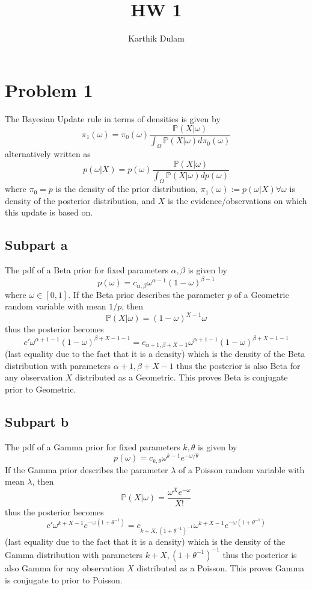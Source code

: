 \documentclass{article}
\title{HW 1}
\author{Karthik Dulam}
\theoremstyle{mytheoremstyle}
\theoremstyle{mytheoremstyle}
\theoremstyle{myproblemstyle}
\begin{document}
    \maketitle
    \section*{Problem 1}
The Bayesian Update rule in terms of densities is given by 
$$ \pi_1(\omega) = \pi_0(\omega) \frac {\mathbb P(X | \omega)} {\int_\Omega \mathbb P(X | \omega) d\pi_0(\omega)}$$
alternatively written as
$$ p(\omega | X) = p(\omega) \frac {\mathbb P(X | \omega)} {\int_\Omega \mathbb P(X | \omega) dp(\omega)}$$
where $\pi_0 = p$ is the density of the prior distribution, $\pi_1(\omega) := p(\omega | X) \forall \omega$  is density of the posterior distribution, 
and $X$ is the evidence/observations on which this update is based on.

\subsection*{Subpart a}
The pdf of a Beta prior for fixed parameters $\alpha, \beta$ is given by $$p(\omega) = c_{\alpha, \beta} \omega^{\alpha - 1}(1-\omega)^{\beta - 1}$$ 
where $\omega \in [0,1]$. 
If the Beta prior describes the parameter $p$ of a Geometric random variable with mean $1/p$, then 
$$\mathbb P(X | \omega) = (1-\omega)^{X-1}\omega$$
thus the posterior becomes 
$$ c'  \omega^{\alpha + 1 - 1}(1-\omega)^{\beta + X - 1 - 1} = c_{\alpha + 1, \beta + X - 1} \omega^{\alpha + 1 - 1}(1-\omega)^{\beta + X - 1 - 1} $$
(last equality due to the fact that it is a density) which is the density of the Beta distribution with parameters
$\alpha + 1, \beta + X - 1$
thus the posterior is also Beta for any observation $X$ distributed as a Geometric.
This proves Beta is conjugate prior to Geometric.

\subsection*{Subpart b}
The pdf of a Gamma prior for fixed parameters $k, \theta$ is given by 
$$p(\omega) = c_{k, \theta} \omega^{k-1}e^{-\omega/\theta}$$
If the Gamma prior describes the parameter $\lambda$ of a Poisson random variable with mean $\lambda$, then 
$$\mathbb P(X | \omega) = \frac{\omega^X e^{-\omega}} {X!}$$
thus the posterior becomes 
$$ c' \omega^{k + X  - 1}e^{-\omega(1+\theta^{-1})}=  c_{k + X, (1+\theta^{-1})^{-1}} \omega^{k+X-1}e^{-\omega(1+\theta^{-1})}$$
(last equality due to the fact that it is a density) which is the density of the Gamma distribution with parameters
$k + X, (1+\theta^{-1})^{-1}$
thus the posterior is also Gamma for any observation $X$ distributed as a Poisson.
This proves Gamma is conjugate to prior to Poisson.
\end{document}

